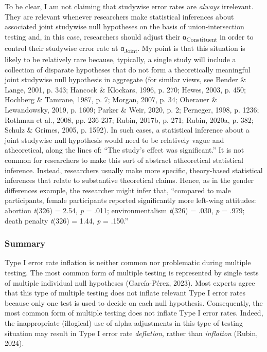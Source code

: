 \documentclass[authordate, empirical]{jote-new-article}
\begin{document}
	To be clear, I am not claiming that studywise error rates are \emph{always} irrelevant. They are relevant whenever researchers make statistical inferences about associated joint studywise null hypotheses on the basis of union-intersection testing and, in this case, researchers should adjust their α\textsubscript{Constituent} in order to control their studywise error rate at α\textsubscript{Joint}. My point is that this situation is likely to be relatively rare because, typically, a single study will include a collection of disparate hypotheses that do not form a theoretically meaningful joint studywise null hypothesis in aggregate (for similar views, see Bender \& Lange, 2001, p. 343; Hancock \& Klockars, 1996, p. 270; Hewes, 2003, p. 450; Hochberg \& Tamrane, 1987, p. 7; Morgan, 2007, p. 34; Oberauer \& Lewandowsky, 2019, p. 1609; Parker \& Weir, 2020, p. 2; Perneger, 1998, p. 1236; Rothman et al., 2008, pp. 236-237; Rubin, 2017b, p. 271; Rubin, 2020a, p. 382; Schulz \& Grimes, 2005, p. 1592). In such cases, a statistical inference about a joint studywise null hypothesis would need to be relatively vague and atheoretical, along the lines of: “The study's effect was significant.” It is not common for researchers to make this sort of abstract atheoretical statistical inference. Instead, researchers usually make more specific, theory-based statistical inferences that relate to substantive theoretical claims. Hence, as in the gender differences example, the researcher might infer that, “compared to male participants, female participants reported significantly more left-wing attitudes: abortion \emph{t}(326) = 2.54, \emph{p} = .011; environmentalism\textsubscript{ }\emph{t}(326) = .030, \emph{p} = .979; death penalty\textsubscript{ }\emph{t}(326) = 1.44, \emph{p} = .150.”



	\subsubsection{Summary}



	Type I error rate inflation is neither common nor problematic during multiple testing. The most common form of multiple testing is represented by single tests of multiple individual null hypotheses (García-Pérez, 2023). Most experts agree that this type of multiple testing does not inflate relevant Type I error rates because only one test is used to decide on each null hypothesis. Consequently, the most common form of multiple testing does not inflate Type I error rates. Indeed, the inappropriate (illogical) use of alpha adjustments in this type of testing situation may result in Type I error rate \emph{deflation}, rather than \emph{inflation} (Rubin, 2024).
\end{document}
